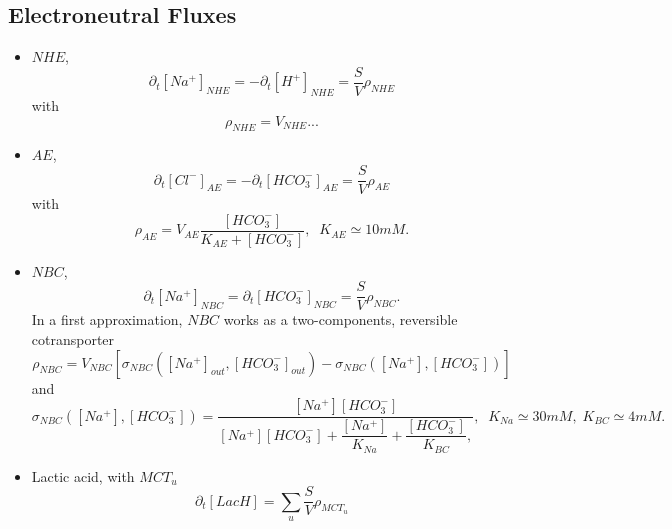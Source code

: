 \documentclass{revtex4}
\begin{document}
\subsection{Electroneutral Fluxes}
\begin{itemize}
	\item $NHE$, 
	\begin{equation}
	\partial_t \left[Na^+\right]_{NHE} = - \partial_t \left[H^+\right]_{NHE} = \dfrac{S}{V} \rho_{NHE}
	\end{equation}
	with
	\begin{equation}
		\rho_{NHE} = V_{NHE}...
	\end{equation}
	
	\item $AE$,
	\begin{equation}
	\partial_t \left[Cl^-\right]_{AE} = -\partial_t \left[HCO_3^-\right]_{AE} = \dfrac{S}{V} \rho_{AE}
	\end{equation}
	with
	\begin{equation}
	\rho_{AE} = V_{AE} \dfrac{\left[HCO_3^-\right]}{K_{AE} + \left[HCO_3^-\right]},\;\; K_{AE}\simeq10mM.
	\end{equation}
	
	\item $NBC$,
	\begin{equation}
	\partial_t \left[Na^+\right]_{NBC} = \partial_t \left[HCO_3^-\right]_{NBC} = \dfrac{S}{V} \rho_{NBC}.
	\end{equation}
	In a first approximation, $NBC$ works as a two-components, reversible cotransporter
	\begin{equation}
		\rho_{NBC} = V_{NBC}
		 \left[ 
		 	\sigma_{NBC}\left(\left[Na^+\right]_{out},\left[HCO_3^-\right]_{out}\right) 
		  - \sigma_{NBC}\left(\left[Na^+\right],\left[HCO_3^-\right]\right) 
		 \right]
	\end{equation}
	and
	\begin{equation}
	\sigma_{NBC}\left(\left[Na^+\right],\left[HCO_3^-\right]\right) =
	\dfrac{\left[Na^+\right]\left[HCO_3^-\right]}
	{
		\left[Na^+\right]\left[HCO_3^-\right]+\dfrac{\left[Na^+\right]}{K_{Na}}+\dfrac{\left[HCO_3^-\right]}{K_{BC}},
	}, \;\; K_{Na} \simeq 30 mM, \; K_{BC} \simeq  4mM.
	\end{equation}	
		
	\item Lactic acid, with $MCT_u$
	\begin{equation}
	\partial_t \left[LacH\right] = \sum_u \dfrac{S}{V}\rho_{MCT_u}
	\end{equation}
\end{itemize}
\end{document}
